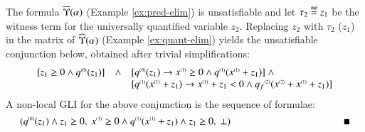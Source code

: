 \begin{example}\label{ex:gli} The formula $\overline{\Upsilon}({\alpha})$
  (Example \ref{ex:pred-elim}) is unsatisfiable and let $\tau_2 \stackrel{\scriptscriptstyle{\mathsf{def}}}{=}
  z_1$ be the witness term for the universally quantified variable
  $z_2$. Replacing $z_2$ with $\tau_2$ ($z_1$) in the matrix of
  $\widehat{\Upsilon}({\alpha})$ (Example \ref{ex:quant-elim}) yields the
  unsatisfiable conjunction below, obtained after trivial
  simplifications:
\[\begin{array}{lcll}
           [z_1 \geq 0 \wedge {q}^{\scriptscriptstyle{({0})}}(z_1)] & \wedge &
           [{q}^{\scriptscriptstyle{({0})}}(z_1) \rightarrow {x}^{\scriptscriptstyle{({1})}} \geq 0 \wedge {q}^{\scriptscriptstyle{({1})}}({x}^{\scriptscriptstyle{({1})}}+z_1)] ~\wedge \\
           && [{q}^{\scriptscriptstyle{({1})}}({x}^{\scriptscriptstyle{({1})}}+z_1) \rightarrow {x}^{\scriptscriptstyle{({1})}}+z_1 < 0 \wedge {q_f}^{\scriptscriptstyle{({2})}}({x}^{\scriptscriptstyle{({2})}}+{x}^{\scriptscriptstyle{({1})}}+z_1)]
\end{array}\]
A non-local GLI for the above conjunction is the sequence of formulae: 
\[(\stamp{q}{0}(z_1) \wedge z_1\geq 0,~ \stamp{x}{1} \geq 0 \wedge \stamp{q}{1}(\stamp{x}{1}+z_1)
\wedge z_1\geq0,~\bot) \hspace*{4cm}\blacksquare\]
\end{example}

